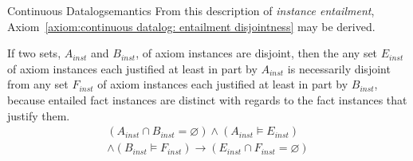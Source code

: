 \begin{nestedsection}{Continuous Datalog}{semantics}
	From this description of \emph{instance entailment}, Axiom~\ref{axiom:continuous datalog: entailment disjointness} may be derived.

\begin{axiom}
\label{axiom:continuous datalog: entailment disjointness}
If two sets, $A_{inst}$ and $B_{inst}$, of axiom instances are
disjoint, then the any set $E_{inst}$ of axiom instances each
justified at least in part by $A_{inst}$ is necessarily disjoint from
any set $F_{inst}$ of axiom instances each justified at least in part
by $B_{inst}$, because entailed fact instances are distinct with
regards to the fact instances that justify them.
\begin{multline*}
\left( A_{inst} \cap B_{inst} = \varnothing \right) \wedge \left( A_{inst} \vDash E_{inst} \right) \\
\wedge \left( B_{inst} \vDash F_{inst} \right) \rightarrow \left( E_{inst} \cap F_{inst} = \varnothing \right)
\end{multline*}
\end{axiom}


\end{nestedsection}

